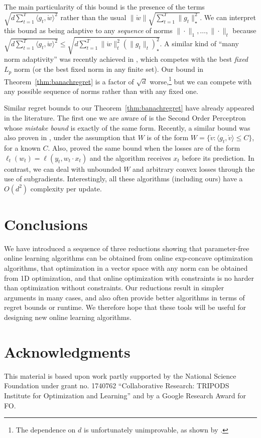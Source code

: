 \documentclass[12pt]{colt2018} %
\newcommand{\w}{\mathring{w}}
\renewcommand{\v}{\mathring{v}}
\begin{document}
The main particularity of this bound is the presence of the terms $\sqrt{d \sum_{t=1}^T \langle g_t,\w\rangle^2}$ rather than the usual $\|\w\|\sqrt{\sum_{t=1}^T \|g_t\|_\star ^2}$. We can interpret this bound as being adaptive to any \emph{sequence} of norms $\|\cdot\|_1,\dots,\|\cdot\|_t$ because $\sqrt{d \sum_{t=1}^T \langle g_t,\w\rangle^2}\le \sqrt{d\sum_{t=1}^T \|\w\|_t^2(\|g_t\|_t)_\star^2}$. A similar kind of ``many norm adaptivity'' was recently achieved in \cite{foster2017parameter}, which competes with the best \emph{fixed} $L_p$ norm (or the best fixed norm in any finite set). Our bound in Theorem~\ref{thm:banachregret} is a factor of $\sqrt{d}$ worse,\footnote{The dependence on $d$ is unfortunately unimprovable, as shown by \citep{luo2016efficient}.} but we can compete with any possible sequence of norms rather than with any fixed one.

Similar regret bounds to our Theorem~\ref{thm:banachregret} have already appeared in the literature. The first one we are aware of is the Second Order Perceptron~\cite{cesa2005second} whose \emph{mistake bound} is exactly of the same form. Recently, a similar bound was also proven in \cite{NIPS2017_7060}, under the assumption that $W$ is of the form $W=\{\v: \langle g_t, \v\rangle \leq C\}$, for a known $C$. Also, \citet{kotlowski2017scale} proved the same bound when the losses are of the form $\ell_t(w_t)=\ell(y_t, w_t \cdot x_t)$ and the algorithm receives $x_t$ before its prediction. In contrast, we can deal with unbounded $W$ and arbitrary convex losses through the use of subgradients. Interestingly, all these algorithms (including ours) have a $O(d^2)$ complexity per update.


\section{Conclusions}

We have introduced a sequence of three reductions showing that parameter-free online learning algorithms can be obtained from online exp-concave optimization algorithms, that optimization in a vector space with any norm can be obtained from 1D optimization, and that online optimization with constraints is no harder than optimization without constraints. Our reductions result in simpler arguments in many cases, and also often provide better algorithms in terms of regret bounds or runtime. We therefore hope that these tools will be useful for designing new online learning algorithms.

\section*{Acknowledgments}
This material is based upon work partly supported by the National Science Foundation under grant no. 1740762 ``Collaborative Research: TRIPODS Institute for Optimization and Learning'' and by a Google Research Award for FO.
\end{document}
